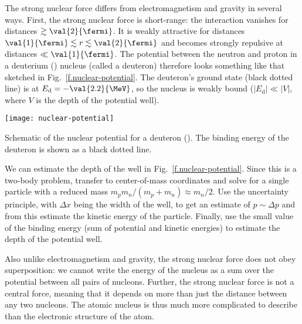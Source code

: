 The strong nuclear force differs from electromagnetism and gravity in several ways. First, the strong nuclear force is short-range: the interaction vanishes for distances $\gtrsim\val{2}{\fermi}$. It is weakly attractive for distances $\val{1}{\fermi}\lesssim r\lesssim\val{2}{\fermi}$ and becomes strongly repulsive at distances $\ll\val{1}{\fermi}$. The potential between the neutron and proton in a deuterium (\hydrogen[2]) nucleus (called a deuteron) therefore looks something like that sketched in Fig.~\ref{f.nuclear-potential}. The deuteron's ground state (black dotted line) is at $E_{\mathrm{d}} = -\val{2.2}{\MeV}$, so the nucleus is weakly bound ($|E_{\mathrm{d}}| \ll |V|$, where $V$ is the depth of the potential well).

\begin{marginfigure}[-8\baselineskip]
\texttt{[image: nuclear-potential]}
\caption[Schematic of the nuclear potential]{\label{f.nuclear-potential}Schematic of the nuclear potential for a deuteron (\hydrogen[2]). The binding energy of the deuteron is shown as a black dotted line.}
\end{marginfigure}


\begin{exercisebox}
We can estimate the depth of the well in Fig.~\ref{f.nuclear-potential}. Since this is a two-body problem, transfer to center-of-mass coordinates and solve for a single particle with a reduced mass $m_{p}m_{n}/(m_{p}+m_{n}) \approx m_{n}/2$. Use the uncertainty principle, with $\Delta x$ being the width of the well, to get an estimate of $p\sim\Delta p$ and from this estimate the kinetic energy of the particle. Finally, use the small value of the binding energy (sum of potential and kinetic energies) to estimate the depth of the potential well.
\end{exercisebox}

Also unlike electromagnetism and gravity, the strong nuclear force does not obey superposition: we cannot write the energy of the nucleus as a sum over the potential between all pairs of nucleons. Further, the strong nuclear force is not a central force, meaning that it depends on more than just the distance between any two nucleons. The atomic nucleus is thus much more complicated to describe than the electronic structure of the atom.

